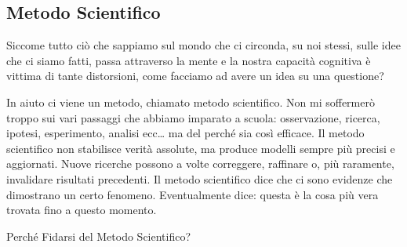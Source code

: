 \documentclass[12pt]{book} %
\begin{document}
\subsection{Metodo Scientifico}
Siccome tutto ciò che sappiamo sul mondo che ci circonda, su noi stessi, sulle idee che ci siamo fatti, passa attraverso
la mente e la nostra capacità cognitiva è vittima di tante distorsioni, come facciamo ad avere un idea su una
questione?

In aiuto ci viene un metodo, chiamato metodo scientifico. Non mi soffermerò troppo sui vari passaggi che abbiamo
imparato a scuola: osservazione, ricerca, ipotesi, esperimento, analisi ecc… ma del perché sia così efficace. Il metodo scientifico non stabilisce verità assolute, ma produce modelli sempre più precisi e aggiornati. Nuove ricerche possono a volte correggere, raffinare o, più raramente, invalidare risultati precedenti. Il metodo scientifico dice che ci sono evidenze che
dimostrano un certo fenomeno. Eventualmente dice: questa è la cosa più vera trovata fino a questo momento.

Perché Fidarsi del Metodo Scientifico? 
\end{document}
